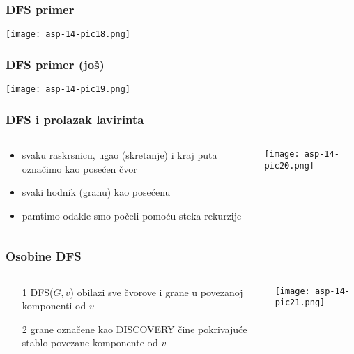 \documentclass[compress,aspectratio=169]{beamer}
\begin{document}
\begin{frame}[fragile]
  \frametitle{DFS primer}
  \begin{center}
    \texttt{[image: asp-14-pic18.png]}
  \end{center}
\end{frame}

\begin{frame}[fragile]
  \frametitle{DFS primer (još)}
  \begin{center}
    \texttt{[image: asp-14-pic19.png]}
  \end{center}
\end{frame}

\begin{frame}[fragile]
  \frametitle{DFS i prolazak lavirinta}
  \begin{columns}
    \begin{column}[t]{6cm}
      \begin{itemize}
        \item svaku raskrsnicu, ugao (skretanje) i kraj puta označimo
          kao posećen čvor
        \item svaki hodnik (granu) kao posećenu
        \item pamtimo odakle smo počeli pomoću steka rekurzije
      \end{itemize}
    \end{column}
    \begin{column}[t]{6cm}
      \begin{center}
        \texttt{[image: asp-14-pic20.png]}
      \end{center}
    \end{column}
  \end{columns}
\end{frame}

\begin{frame}[fragile]
  \frametitle{Osobine DFS}
  \begin{columns}
    \begin{column}[t]{6cm}
      \begin{itemize}
        \item[1] DFS($G,v$) obilazi sve čvorove i grane u povezanoj 
          komponenti od $v$
        \item[2] grane označene kao {\scriptsize DISCOVERY} čine 
          pokrivajuće stablo povezane komponente od $v$
      \end{itemize}
    \end{column}
    \begin{column}[t]{6cm}
      \begin{center}
        \texttt{[image: asp-14-pic21.png]}
      \end{center}
    \end{column}
  \end{columns}
\end{frame}
\end{document}
